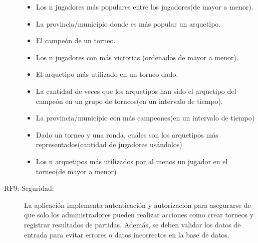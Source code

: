\documentclass[a4paper]{article}
\begin{document}
\begin{description}
\begin{itemize}
    \item Los n jugadores m\'as populares entre los jugadores(de mayor a menor).
    \item La provincia/municipio donde es m\'as popular un arquetipo.
    \item El campe\'on de un torneo.
    \item Los n jugadores con m\'as victorias (ordenados de mayor a menor).
    \item El arquetipo m\'as utilizado en un torneo dado.
    \item La cantidad de veces que los arquetipos han sido el arquetipo del campe\'on en un grupo de torneos(en un intervalo de tiempo).
    \item La provincia/municipio con m\'as campeones(en un intervalo de tiempo)
    \item Dado un torneo y una ronda, cu\'ales son los arquetipos m\'as representados(cantidad de jugadores us\'andolos)
    \item Los n arquetipos m\'as utilizados por al menos un jugador en el torneo(de mayor a menor)    
    \end{itemize}
    \item[RF9: Seguridad:] La aplicaci\'on implementa autenticaci\'on y autorizaci\'on para asegurarse de que solo los administradores pueden realizar acciones como crear torneos y registrar resultados de partidas. Adem\'as, se deben validar los datos de entrada para evitar errores o datos incorrectos en la base de datos.
\end{description} 
\end{document}
